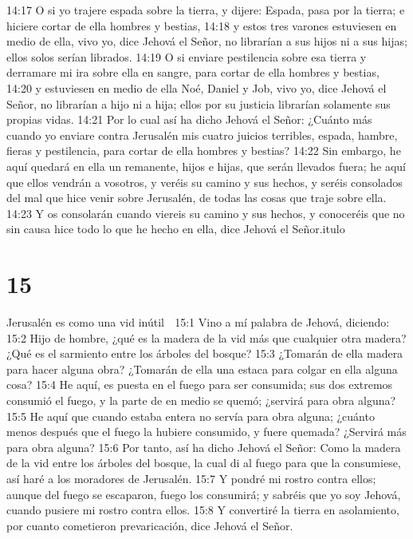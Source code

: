 14:17 O si yo trajere espada sobre la tierra, y dijere: Espada, pasa por la tierra; e hiciere cortar de ella hombres y bestias, 
14:18 y estos tres varones estuviesen en medio de ella, vivo yo, dice Jehová el Señor, no librarían a sus hijos ni a sus hijas; ellos solos serían librados.  
14:19 O si enviare pestilencia sobre esa tierra y derramare mi ira sobre ella en sangre, para cortar de ella hombres y bestias,  
14:20 y estuviesen en medio de ella Noé, Daniel y Job, vivo yo, dice Jehová el Señor, no librarían a hijo ni a hija; ellos por su justicia librarían solamente sus propias vidas.  
14:21 Por lo cual así ha dicho Jehová el Señor: ¿Cuánto más cuando yo enviare contra Jerusalén mis cuatro juicios terribles, espada, hambre, fieras y pestilencia,  para cortar de ella hombres y bestias?  
14:22 Sin embargo, he aquí quedará en ella un remanente, hijos e hijas, que serán llevados fuera; he aquí que ellos vendrán a vosotros, y veréis su camino y sus hechos, y seréis consolados del mal que hice venir sobre Jerusalén, de todas las cosas que traje sobre ella.  
14:23 Y os consolarán cuando viereis su camino y sus hechos, y conoceréis que no sin causa hice todo lo que he hecho en ella, dice Jehová el Señor.itulo  

\chapter{15}

Jerusalén es como una vid inútil  

15:1 Vino a mí palabra de Jehová, diciendo:  
15:2 Hijo de hombre, ¿qué es la madera de la vid más que cualquier otra madera? ¿Qué es el sarmiento entre los árboles del bosque?  
15:3 ¿Tomarán de ella madera para hacer alguna obra? ¿Tomarán de ella una estaca para colgar en ella alguna cosa?  
15:4 He aquí, es puesta en el fuego para ser consumida; sus dos extremos consumió el fuego, y la parte de en medio se quemó; ¿servirá para obra alguna?  
15:5 He aquí que cuando estaba entera no servía para obra alguna; ¿cuánto menos después que el fuego la hubiere consumido, y fuere quemada? ¿Servirá más para obra alguna?  
15:6 Por tanto, así ha dicho Jehová el Señor: Como la madera de la vid entre los árboles del bosque, la cual di al fuego para que la consumiese, así haré a los moradores de Jerusalén.  
15:7 Y pondré mi rostro contra ellos; aunque del fuego se escaparon, fuego los consumirá; y sabréis que yo soy Jehová, cuando pusiere mi rostro contra ellos.  
15:8 Y convertiré la tierra en asolamiento, por cuanto cometieron prevaricación, dice Jehová el Señor.  

